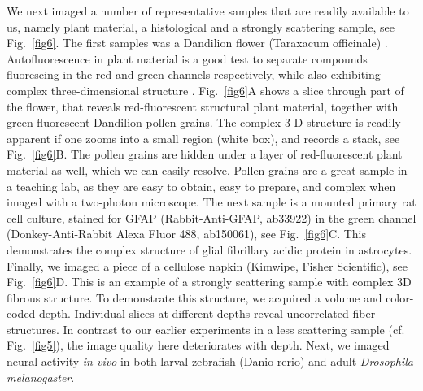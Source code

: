 \documentclass[10pt,letterpaper]{article}
\begin{document}
We next imaged a number of representative samples that are readily available to us, namely plant material, a histological and a strongly scattering sample, see Fig.~\ref{fig6}. The first samples was a Dandilion flower (Taraxacum officinale) \cite{Rupprecht2018}. Autofluorescence in plant material is a good test to separate compounds fluorescing in the red and green channels respectively, while also exhibiting complex three-dimensional structure \cite{Cheung2010, Nguyen2001}. Fig.~\ref{fig6}A shows a slice through part of the flower, that reveals red-fluorescent structural plant material, together with green-fluorescent Dandilion pollen grains. The complex 3-D structure is readily apparent if one zooms into a small region (white box), and records a stack, see Fig.~\ref{fig6}B. The pollen grains are hidden under a layer of red-fluorescent plant material as well, which we can easily resolve. Pollen grains are a great sample in a teaching lab, as they are easy to obtain, easy to prepare, and complex when imaged with a two-photon microscope\cite{Rupprecht2018}. The next sample is a mounted primary rat cell culture\cite{Schottdorf2018}, stained for GFAP (Rabbit-Anti-GFAP, ab33922) in the green channel (Donkey-Anti-Rabbit Alexa Fluor 488, ab150061), see Fig.~\ref{fig6}C. This demonstrates the complex structure of glial fibrillary acidic protein in astrocytes. Finally, we imaged a piece of a cellulose napkin (Kimwipe, Fisher Scientific), see Fig.~\ref{fig6}D. This is an example of a strongly scattering sample with complex 3D fibrous structure. To demonstrate this structure, we acquired a volume and color-coded depth. Individual slices at different depths reveal uncorrelated fiber structures. In contrast to our earlier experiments in a less scattering sample (cf. Fig.~\ref{fig5}), the image quality here deteriorates with depth.\newline
Next, we imaged neural activity \textit{in vivo} in both larval zebrafish (Danio rerio) and adult \textit{Drosophila melanogaster}. 
%
\end{document}

